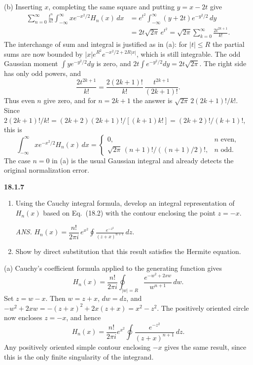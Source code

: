 (b) Inserting $x$, completing the same square and putting $y=x-2t$ give
\begin{align*}
\sum_{n=0}^\infty\frac{t^n}{n!}
 \int_{-\infty}^{\infty}xe^{-x^2/2}H_n(x)\,dx
 &=e^{t^2}\int_{-\infty}^{\infty}(y+2t)e^{-y^2/2}\,dy\\
 &=2t\sqrt{2\pi}\,e^{t^2}
 =\sqrt{2\pi}\sum_{k=0}^\infty\frac{2t^{2k+1}}{k!}.
\end{align*}
The interchange of sum and integral is justified as in (a): for
$|t|\le R$ the partial sums are now bounded by
$|x|e^{R^2}e^{-x^2/2+2R|x|}$, which is still integrable.
The odd Gaussian moment $\int ye^{-y^2/2}dy$ is zero, and
$2t\int e^{-y^2/2}dy=2t\sqrt{2\pi}$.  The right side has only odd
powers, and
\[
\frac{2t^{2k+1}}{k!}=\frac{2(2k+1)!}{k!}\,\frac{t^{2k+1}}{(2k+1)!}.
\]
Thus even $n$ give zero, and for $n=2k+1$ the answer is
$\sqrt{2\pi}\,2(2k+1)!/k!$.  Since $2(2k+1)!/k!=(2k+2)(2k+1)!/[(k+1)k!]=(2k+2)!/(k+1)!$, this is
\[
\boxed{\int_{-\infty}^{\infty}xe^{-x^2/2}H_n(x)\,dx
 =\begin{cases}0,&n\text{ even},\\[3pt]
 \sqrt{2\pi}\,(n+1)!/((n+1)/2)!,&n\text{ odd}.
 \end{cases}}
\]
  The case $n=0$ in (a) is the usual Gaussian
integral and already detects the original normalization error.

\par\bigskip
\noindent\textbf{18.1.7}
\begin{enumerate}
\item[(a)] Using the Cauchy integral formula, develop an integral
representation of $H_{n}(x)$ based on Eq.~(18.2) with the contour
enclosing the point $z=-x$.
\par\nobreak\hfill\emph{ANS.}\enspace
$H_{n}(x)=\dfrac{n!}{2\pi i}\,e^{x^{2}}
\displaystyle\oint\frac{e^{-z^{2}}}{(z+x)^{n+1}}\,dz$.
\item[(b)] Show by direct substitution that this result satisfies the
Hermite equation.
\end{enumerate}
\solution
(a) Cauchy's coefficient formula applied to the generating function gives
\[
H_n(x)=\frac{n!}{2\pi i}\oint_{|w|=R}
 \frac{e^{-w^2+2xw}}{w^{n+1}}\,dw.
\]
Set $z=w-x$.  Then $w=z+x$, $dw=dz$, and
$-w^2+2xw=-(z+x)^2+2x(z+x)=x^2-z^2$.
The positively oriented circle now encloses $z=-x$, and hence
\[
\boxed{H_n(x)=\frac{n!}{2\pi i}e^{x^2}
 \oint\frac{e^{-z^2}}{(z+x)^{n+1}}\,dz}.
\]
Any positively oriented simple contour enclosing $-x$ gives the same
result, since this is the only finite singularity of the integrand.

